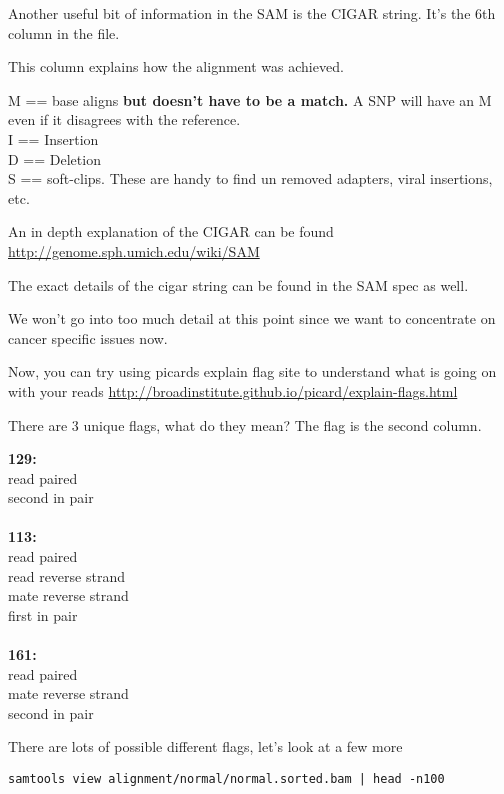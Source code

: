 Another useful bit of information in the SAM is the CIGAR string.
It's the 6th column in the file. 

This column explains how the alignment was achieved.
 
        M == base aligns \textbf{but doesn't have to be a match.} A SNP will have an M even if it disagrees with the reference.\\
        I == Insertion\\
        D == Deletion\\
        S == soft-clips. These are handy to find un removed adapters, viral insertions, etc.

An in depth explanation of the CIGAR can be found \url{http://genome.sph.umich.edu/wiki/SAM}

The exact details of the cigar string can be found in the SAM spec as well.


We won't go into too much detail at this point since we want to concentrate on cancer specific issues now.


Now, you can try using picards explain flag site to understand what is going on with your reads
\url{http://broadinstitute.github.io/picard/explain-flags.html}

\begin{question} 
There are 3 unique flags, what do they mean? The flag is the second column.
\end{question}
\begin{answer}
\textbf{129:}\\ 
    read paired\\
    second in pair\\ \\
\textbf{113:}\\
    read paired\\
    read reverse strand\\
    mate reverse strand\\
    first in pair\\ \\
\textbf{161:}\\
    read paired\\
    mate reverse strand\\
    second in pair\\
\end{answer}

There are lots of possible different flags, let's look at a few more
\begin{lstlisting}
samtools view alignment/normal/normal.sorted.bam | head -n100
\end{lstlisting}



